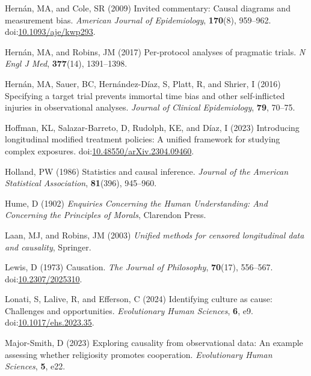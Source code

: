 \documentclass[
  singlecolumn]{article}
\newlength{\cslhangindent}
\newenvironment{CSLReferences}[2] %
 {\begin{list}{}{%
  \setlength{\itemindent}{0pt}
  \setlength{\leftmargin}{0pt}
  \setlength{\parsep}{0pt}
  \ifodd #1
   \setlength{\leftmargin}{\cslhangindent}
   \setlength{\itemindent}{-1\cslhangindent}
  \fi
  \setlength{\itemsep}{#2\baselineskip}}}
 {\end{list}}
\begin{document}
\begin{CSLReferences}{1}{0}
Hernán, MA, and Cole, SR (2009) Invited commentary: Causal diagrams and
measurement bias. \emph{American Journal of Epidemiology},
\textbf{170}(8), 959--962.
doi:\href{https://doi.org/10.1093/aje/kwp293}{10.1093/aje/kwp293}.

Hernán, MA, and Robins, JM (2017) Per-protocol analyses of pragmatic
trials. \emph{N Engl J Med}, \textbf{377}(14), 1391--1398.

Hernán, MA, Sauer, BC, Hernández-Díaz, S, Platt, R, and Shrier, I (2016)
Specifying a target trial prevents immortal time bias and other
self-inflicted injuries in observational analyses. \emph{Journal of
Clinical Epidemiology}, \textbf{79}, 70--75.

Hoffman, KL, Salazar-Barreto, D, Rudolph, KE, and Díaz, I (2023)
Introducing longitudinal modified treatment policies: A unified
framework for studying complex exposures.
doi:\href{https://doi.org/10.48550/arXiv.2304.09460}{10.48550/arXiv.2304.09460}.

Holland, PW (1986) Statistics and causal inference. \emph{Journal of the
American Statistical Association}, \textbf{81}(396), 945--960.

Hume, D (1902) \emph{Enquiries Concerning the Human Understanding: And
Concerning the Principles of Morals}, Clarendon Press.

Laan, MJ, and Robins, JM (2003) \emph{Unified methods for censored
longitudinal data and causality}, Springer.

Lewis, D (1973) Causation. \emph{The Journal of Philosophy},
\textbf{70}(17), 556--567.
doi:\href{https://doi.org/10.2307/2025310}{10.2307/2025310}.

Lonati, S, Lalive, R, and Efferson, C (2024) Identifying culture as
cause: Challenges and opportunities. \emph{Evolutionary Human Sciences},
\textbf{6}, e9.
doi:\href{https://doi.org/10.1017/ehs.2023.35}{10.1017/ehs.2023.35}.

Major-Smith, D (2023) Exploring causality from observational data: An
example assessing whether religiosity promotes cooperation.
\emph{Evolutionary Human Sciences}, \textbf{5}, e22.


\end{CSLReferences}
\end{document}
